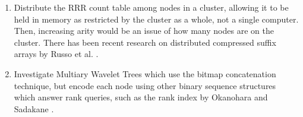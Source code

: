 \begin{enumerate}
\item
	Distribute the RRR count table among nodes in a cluster, allowing it to be
	held in memory as restricted by the cluster as a whole, not a single
	computer. Then, increasing arity would be an issue of how many nodes are
	on the cluster. There has been recent research on distributed compressed
	suffix arrays by Russo et al. \cite{russo2010}.

\item
	Investigate Multiary Wavelet Trees which use the bitmap concatenation 
	technique, but encode each node using other binary sequence structures which 
	answer rank queries, such as the rank index by Okanohara and Sadakane 
	\cite{okanohara2006}.

\end{enumerate}